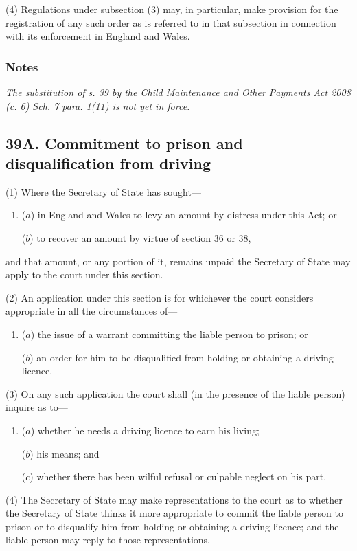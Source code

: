 \documentclass[a4paper]{article}
\newcommand\amendment[1]{\subsubsection*{Notes}{\itshape\frenchspacing\footnotesize #1 \par}}
\begin{document}
(4) Regulations under subsection (3) may, in particular, make provision for the registration of any such order as is referred to in that subsection in connection with its enforcement in England and Wales.

\amendment{
The substitution of s. 39 by the Child Maintenance and Other Payments Act 2008 (c. 6) Sch. 7 para. 1(11) is not yet in force.
}

\subsection{39A. Commitment to prison and disqualification from driving}

(1) Where the Secretary of State has sought---
\begin{enumerate}\item[]
($a$) in England and Wales to levy an amount by distress under this Act; or

($b$) to recover an amount by virtue of section 36 or 38, 
\end{enumerate}
and that amount, or any
portion of it, remains unpaid the Secretary of State may apply to the court
under this section.

(2)
An application under this section is for whichever the court considers appropriate in all the circumstances of---
\begin{enumerate}\item[]
($a$) the issue of a warrant committing the liable person to prison; or

($b$) an order for him to be disqualified from holding or obtaining a driving
licence.
\end{enumerate}

(3)
On any such application the court shall (in the presence of the liable person) inquire as to---
\begin{enumerate}\item[]
($a$) whether he needs a driving licence to earn his living;

($b$) his means; and

($c$) whether there has been wilful refusal or culpable neglect on his part.
\end{enumerate}

(4)
The Secretary of State may make representations to the court as to whether the Secretary of State thinks it more appropriate to commit the liable person to prison or to disqualify him from holding or obtaining a driving licence; and the liable person may reply to those representations.
\end{document}
